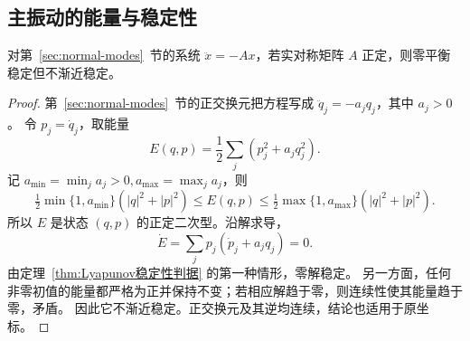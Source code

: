 \subsection*{主振动的能量与稳定性}
\begin{proposition}\label{prop:normal-mode-stability}
对第~\ref{sec:normal-modes}~节的系统 $\ddot x=-Ax$，若实对称矩阵 $A$ 正定，则零平衡稳定但不渐近稳定。
\end{proposition}
\begin{proof}
第~\ref{sec:normal-modes}~节的正交换元把方程写成 $\ddot q_j=-a_jq_j$，其中 $a_j>0$。
令 $p_j=\dot q_j$，取能量
\[
 E(q,p)=\frac12\sum_j(p_j^2+a_jq_j^2).
\]
记 $a_{\min}=\min_ja_j>0,a_{\max}=\max_ja_j$，则
\[
 \tfrac12\min\{1,a_{\min}\}(|q|^2+|p|^2)
 \leq E(q,p)
 \leq\tfrac12\max\{1,a_{\max}\}(|q|^2+|p|^2).
\]
所以 $E$ 是状态 $(q,p)$ 的正定二次型。沿解求导，
\[
 \dot E=\sum_jp_j(\dot p_j+a_jq_j)=0.
\]
由定理~\ref{thm:Lyapunov稳定性判据} 的第一种情形，零解稳定。
另一方面，任何非零初值的能量都严格为正并保持不变；若相应解趋于零，则连续性使其能量趋于零，矛盾。
因此它不渐近稳定。正交换元及其逆均连续，结论也适用于原坐标。
\end{proof}
